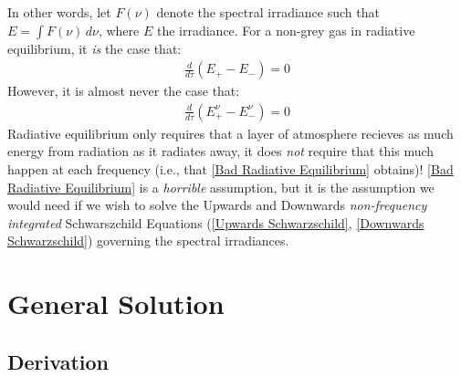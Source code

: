 In other words, let $F(\nu)$ denote the spectral irradiance such that $E=\int F(\nu)\,d\nu$, where $E$ the irradiance. For a non-grey gas in radiative equilibrium, it \textit{is} the case that:
\begin{align*}
    \frac{d}{d\tau}(E_+-E_-)=0
\end{align*}
However, it is almost never the case that:
\begin{align}\label{Bad Radiative Equilibrium}
    \frac{d}{d\tau}(E^\nu_{+}-E^\nu_-)=0
\end{align}
Radiative equilibrium only requires that a layer of atmosphere recieves as much energy from radiation as it radiates away, it does \textit{not} require that this much happen at each frequency (i.e., that \ref{Bad Radiative Equilibrium} obtains)! \ref{Bad Radiative Equilibrium} is a \textit{horrible} assumption, but it is the assumption we would need if we wish to solve the Upwards and Downwards \textit{non-frequency integrated} Schwarszchild Equations (\ref{Upwards Schwarzschild}, \ref{Downwards Schwarzschild}) governing the spectral irradiances.


\section{General Solution}

\subsection{Derivation}

